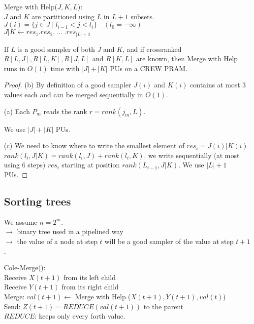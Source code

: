 \begin{algorithm}
Merge with Help($J,K,L$):\\
$J$ and $K$ are partitioned using $L$ in $L+1$ subsets.\\
$J(i)=\{ j\in J \;|\; l_{i-1}<j<l_i\} \quad (l_0=-\infty)$\\
$J|K \leftarrow res_1.res_2. \;\hdots\; . res_{|L|+1}$
\end{algorithm}

\begin{lemma}
If $L$ is a good sampler of both $J$ and $K$, and if crossranked $R[L,J], R[L,K],R[J,L]$ and $R[K,L]$ are known, then Merge with Help runs in $O(1)$ time with $|J|+|K|$ PUs on a CREW PRAM.
\end{lemma}

\begin{proof}
(b) By definition of a good sampler $J(i)$ and $K(i)$ contains at most 3 values each and can be merged sequentially in $O(1)$.

(a) Each $P_m$ reads the rank $r=rank(j_m,L)$.

\begin{algorithm}[H]
\end{algorithm}
We use $|J|+|K|$ PUs.

(c) We need to know where to write the smallest element of $res_i=J(i)|K(i)$\\
$rank(l_i, J|K)=rank(l_i,J)+rank(l_i,K)$. we write sequentially (at most using 6 steps) $res_i$ starting at position $rank(L_{i-1},J|K)$. We use $|L|+1$ PUs.
\end{proof}

\subsection{Sorting trees}
We assume $n=2^m$.\\
$\rightarrow$ binary tree used in a pipelined way\\
$\rightarrow$ the value of a node at step $t$ will be a good sampler of the value at step $t+1$.

\begin{algorithm}[H]
Cole-Merge():\\
Receive $X(t+1)$ from its left child\\
Receive $Y(t+1)$ from its right child\\
Merge: $val(t+1)\leftarrow$ Merge with Help ($X(t+1), Y(t+1), val(t)$)\\
Send: $Z(t+1)=REDUCE(val(t+1))$ to the parent\\
$REDUCE$: keeps only every forth value.
\end{algorithm}

